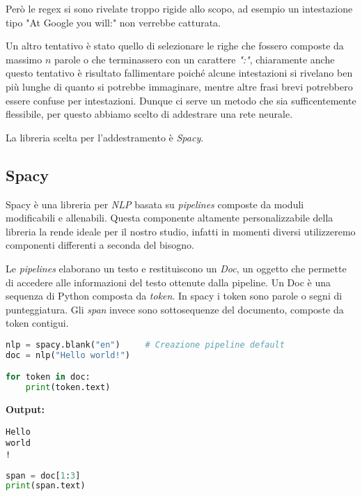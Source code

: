 \noindent Però le regex si sono rivelate troppo rigide allo scopo, ad esempio un intestazione tipo "At Google you will:" non verrebbe catturata.

\medskip

\noindent Un altro tentativo è stato quello di selezionare le righe che fossero composte da massimo $n$ parole o che terminassero con un carattere \textit{":"}, chiaramente anche questo tentativo è risultato fallimentare poiché alcune intestazioni si rivelano ben più lunghe di quanto si potrebbe immaginare, mentre altre frasi brevi potrebbero essere confuse per intestazioni. Dunque ci serve un metodo che sia sufficentemente flessibile, per questo abbiamo scelto di addestrare una rete neurale.

\medskip

\noindent La libreria scelta per l'addestramento è \textit{Spacy}.

\medskip

\subsection{Spacy}
\noindent Spacy è una libreria per \textit{NLP} basata su \textit{pipelines} composte da moduli modificabili e allenabili. Questa componente altamente personalizzabile della libreria la rende ideale per il nostro studio, infatti in momenti diversi utilizzeremo componenti differenti a seconda del bisogno.

\noindent Le \textit{pipelines} elaborano un testo e restituiscono un \textit{Doc}, un oggetto che permette di accedere alle informazioni del testo ottenute dalla pipeline. Un Doc è una sequenza di Python composta da \textit{token}. In spacy i token sono parole o segni di punteggiatura.
\noindent Gli \textit{span} invece sono sottosequenze del documento, composte da token contigui.

\begin{lstlisting}[language=python]
nlp = spacy.blank("en")     # Creazione pipeline default
doc = nlp("Hello world!")

for token in doc:
    print(token.text)
\end{lstlisting}

\noindent \textbf{Output:}

\begin{lstlisting}[style=output]
Hello
world
!
\end{lstlisting}

\begin{lstlisting}[language=python]
span = doc[1:3]
print(span.text)
\end{lstlisting}

